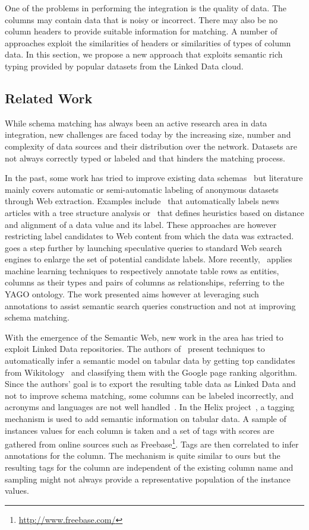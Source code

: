 One of the problems in performing the integration is the quality of data. The columns may contain data that is noisy or incorrect. There may also be no column headers to provide suitable information for matching. A number of approaches exploit the similarities of headers or similarities of types of column data. In this section, we propose a new approach that exploits semantic rich typing provided by popular datasets from the Linked Data cloud.

\subsection{Related Work}

While schema matching has always been an active research area in data integration, new challenges are faced today by the increasing size, number and complexity of data sources and their distribution over the network. Datasets are not always correctly typed or labeled and that hinders the matching process.

In the past, some work has tried to improve existing data schemas~\cite{ Miller:IEEE:03} but literature mainly covers automatic or semi-automatic labeling of anonymous datasets through Web extraction. Examples include~\cite{Reis:WWW:04} that automatically labels news articles with a tree structure analysis or~\cite{Wang:WWW:03} that defines heuristics based on distance and alignment of a data value and its label. These approaches are however restricting label candidates to Web content from which the data was extracted.~\cite{DaSilva:OTM:07} goes a step further by launching speculative queries to standard Web search engines to enlarge the set of potential candidate labels. More recently,~\cite{Limaye:VLDB:10} applies machine learning techniques to respectively annotate table rows as entities, columns as their types and pairs of columns as relationships, referring to the YAGO ontology. The work presented aims however at leveraging such annotations to assist semantic search queries construction and not at improving schema matching.

With the emergence of the Semantic Web, new work in the area has tried to exploit Linked Data repositories. The authors of~\cite{Syed:WebSci:10} present techniques to automatically infer a semantic model on tabular data by getting top candidates from Wikitology~\cite{Finin:AAAI:09} and classifying them with the Google page ranking algorithm. Since the authors' goal is to export the resulting table data as Linked Data and not to improve schema matching, some columns can be labeled incorrectly, and acronyms and languages are not well handled~\cite{Syed:WebSci:10}. In the Helix project~\cite{Hassanzadeh:WWW:11}, a tagging mechanism is used to add semantic information on tabular data. A sample of instances values for each column is taken and a set of tags with scores are gathered from online sources such as Freebase\footnote{\url{http://www.freebase.com/}}. Tags are then correlated to infer annotations for the column. The mechanism is quite similar to ours but the resulting tags for the column are independent of the existing column name and sampling might not always provide a representative population of the instance values.

